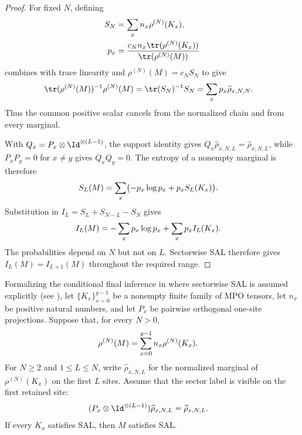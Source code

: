 \begin{proof}\leanok
    For fixed $N$, defining
    \begin{align}
        S_N & =\sum_x n_x\rho^{(N)}(K_x),
        \notag                                    \\
        p_x & =\frac{c_N n_x\tr(\rho^{(N)}(K_x))}
        {\tr(\rho^{(N)}(M))}
        \notag
    \end{align}
    combines with trace linearity and $\rho^{(N)}(M)=c_NS_N$ to give
    \begin{align}
        \tr(\rho^{(N)}(M))^{-1}\rho^{(N)}(M)
         & =\tr(S_N)^{-1}S_N
        =\sum_x p_x\widehat\rho_{x,N,N}.
        \notag
    \end{align}
    Thus the common positive scalar cancels from the normalized chain and from
    every marginal.

    With $Q_x=P_x\otimes\Id^{\otimes(L-1)}$, the support identity gives
    $Q_x\widehat\rho_{x,N,L}=\widehat\rho_{x,N,L}$, while $P_xP_y=0$ for
    $x\ne y$ gives $Q_xQ_y=0$. The entropy of a nonempty marginal is therefore
    \begin{align}
        S_L(M)
         & =\sum_x\bigl(-p_x\log p_x+p_xS_L(K_x)\bigr).
        \notag
    \end{align}
    Substitution in $I_L=S_L+S_{N-L}-S_N$ gives
    \begin{align}
        I_L(M)
         & =-\sum_x p_x\log p_x+\sum_x p_xI_L(K_x).
        \notag
    \end{align}
    The probabilities depend on $N$ but not on $L$. Sectorwise SAL therefore
    gives $I_L(M)=I_{L+1}(M)$ throughout the required range.
\end{proof}

\begin{lemma}
    \label{thm:mpdo_local_orthogonal_sum_sal}
    \leanok
    Formalizing the conditional final inference in
    \cite[Appendix~C.2, lines~1801--1808]{Cirac2016MPDO_arXiv} where
    sectorwise SAL is assumed explicitly (see
    \cite{gap:cpsv16_commuting_form_to_sal}), let $\{K_x\}_{x=0}^{g-1}$ be a
    nonempty finite family of MPO tensors, let $n_x$ be positive natural
    numbers, and let $P_x$ be pairwise orthogonal one-site projections.
    Suppose that, for every $N>0$,
    \begin{align}
        \rho^{(N)}(M)
         & =\sum_{x=0}^{g-1}n_x\rho^{(N)}(K_x).
        \notag
    \end{align}
    For $N\geq2$ and $1\leq L\leq N$, write
    $\widehat\rho_{x,N,L}$ for the normalized marginal of
    $\rho^{(N)}(K_x)$ on the first $L$ sites. Assume that the sector label is
    visible on the first retained site:
    \begin{align}
        (P_x\otimes\Id^{\otimes(L-1)})
        \widehat\rho_{x,N,L}
         & =\widehat\rho_{x,N,L}.
        \notag
    \end{align}
    If every $K_x$ satisfies SAL, then $M$ satisfies SAL.
\end{lemma}

